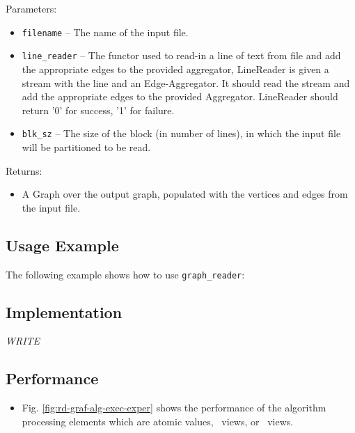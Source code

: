 Parameters:
\begin{itemize}
\item
\texttt{filename} --
The name of the input file.
\item
\texttt{line\_reader} --
The functor used to read-in a line of text from file and add the appropriate edges to the provided aggregator, LineReader is given a stream with the line and an Edge-Aggregator. It should read the stream and add the appropriate edges to the provided Aggregator. LineReader should return '0' for success, '1' for failure.
\item
\texttt{blk\_sz} --
The size of the block (in number of lines), in which the input file will be partitioned to be read.
\end{itemize}

Returns:
\begin{itemize}
\item
A Graph over the output graph, populated with the vertices and edges from the input file. 
\end{itemize}

\subsection{Usage Example} \label{sec-rd-graf-alg-use}

The following example shows how to use 
\texttt{graph\_reader}:


\subsection{Implementation} \label{sec-rd-graf-alg-impl}

\textit{WRITE}

\subsection{Performance} \label{sec-rd-graf-alg-perf}

\begin{itemize}
\item
Fig. \ref{fig:rd-graf-alg-exec-exper}
shows the performance of the algorithm processing
elements which are atomic values, \stl\ views, or \stapl\ views.
\end{itemize}

